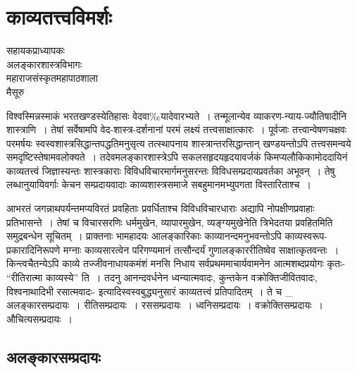 {\fontsize{15}{17}\selectfont
\chapter{काव्यतत्त्वविमर्शः}

\begin{center}
\smallskip

सहायकप्राध्यापकः\\
अलङ्कारशास्त्रविभागः\\
महाराजसंस्कृतमहापाठशाला\\
मैसूरु
\addrule
\end{center}
विश्वस्मिन्नस्माकं भरतखण्डस्येतिहासः वेदवा$‰$यादेवारभ्यते~। तन्मूलान्येव व्याकरण-न्याय-ज्यौतिषादीनि शास्त्राणि~। तेषां सर्वेषामपि वेद-शास्त्र-दर्शनानां परमं लक्ष्यं तत्त्वसाक्षात्कारः~। पूर्वजाः तत्त्वान्वेषणचक्षवः परमर्षयः स्वस्वशास्त्रसिद्धान्तपद्धतिमनुसृत्य तत्स्थापनाय शास्त्रान्तरसिद्धान्तान् खण्डयन्तोऽपि तत्त्वसमन्वये समदृष्टिस्तेषामवलोक्यते~।  तदेवमलङ्कारशास्त्रेऽपि सकलसहृदयहृदयावर्जकं किमप्यलौकिकामोददायिनं काव्यतत्त्वं जिज्ञास्यन्तः शास्त्रकाराः विविधविचारमार्गमनुसरन्तः विविधसम्प्रदायप्रवर्तका अभूवन्~। तेषु लब्धानुयायिवर्गाः केचन सम्प्रदायवादाः काव्यशास्त्रसमाजे सबहुमानमभ्युपगता विस्तारिताश्च~। 

आभरतं जगन्नाथपर्यन्तमप्यविरतं प्रवहिताः प्रवर्धिताश्च विविधविचारधाराः अद्यापि नोपक्षीणप्रवाहाः प्रतिभासन्ते~। तेषां च विचारसरणिः धर्ममुखेन, व्यापारमुखेन, व्यङ्ग्यमुखेनेति त्रिभेदतया प्रवहितमिति समुद्रबन्धेन सूचितम्~। प्राक्तनाः भामहादयः आलङ्कारिकाः काव्यानन्दमनुभवन्तोऽपि काव्यस्वरूप-प्रकारादिनिरूपणे मग्नाः काव्यसारत्वेन परिगण्यमानं तत्सौन्दर्यं गुणालङ्काररीतिष्वेव साक्षात्कृतवन्तः~। किन्त्वचैतन्येऽपि काव्ये तज्जीवनाधायकमंशं मनसि निधाय सर्वप्रथममाचार्यवामनेन आत्मशब्दप्रयोगः कृतः- “रीतिरात्मा काव्यस्ये” ति~।  तदनु आनन्दवर्धनेन ध्वन्यात्मवादः, कुन्तकेन वक्रोक्तिजीवितवादः, विश्वनाथादिभी रसात्मवादः- इत्यादिस्वस्वबुद्ध्यनुसारं काव्यतत्त्वं प्रतिपादितम्~। ते च \_    अलङ्कारसम्प्रदायः~।     रीतिसम्प्रदायः~। 	     रससम्प्रदायः~।   ध्वनिसम्प्रदायः~। 	   वक्रोक्तिसम्प्रदायः~।   औचित्यसम्प्रदायः~। 

\section*{ अलङ्कारसम्प्रदायः}

}
